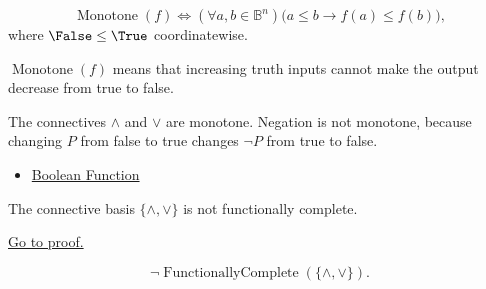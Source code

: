 \begin{remark*}
\[
\operatorname{Monotone}(f)
\Longleftrightarrow
(\forall a,b\in\mathbb{B}^n)
\bigl(a\le b\to f(a)\le f(b)\bigr),
\]
where \(\False\le\True\) coordinatewise.
\end{remark*}

\begin{remark*}
\(\operatorname{Monotone}(f)\) means that increasing truth inputs cannot make the
output decrease from true to false.
\end{remark*}

\begin{remark*}[Interpretation]
The connectives \(\land\) and \(\lor\) are monotone. Negation is not monotone,
because changing \(P\) from false to true changes \(\neg P\) from true to false.
\end{remark*}

\begin{dependencies}
\begin{itemize}
  \item \hyperref[def:boolean-function-propositional-logic]{Boolean Function}
\end{itemize}
\end{dependencies}

\begin{tcolorbox}[colback=thmbox, colframe=thmborder, arc=2pt,
  left=6pt, right=6pt, top=4pt, bottom=4pt,
  title={\small\textbf{Theorem (Conjunction and Disjunction are not Functionally Complete)}},
  fonttitle=\small\bfseries]
\begin{theorem}
\label{thm:conjunction-disjunction-not-functionally-complete-propositional-logic}
The connective basis \(\{\land,\lor\}\) is not functionally complete.

\noindent\hyperref[prf:conjunction-disjunction-not-functionally-complete-propositional-logic]{Go to proof.}
\end{theorem}
\end{tcolorbox}

\begin{remark*}
\[
\neg\operatorname{FunctionallyComplete}(\{\land,\lor\}).
\]
\end{remark*}

